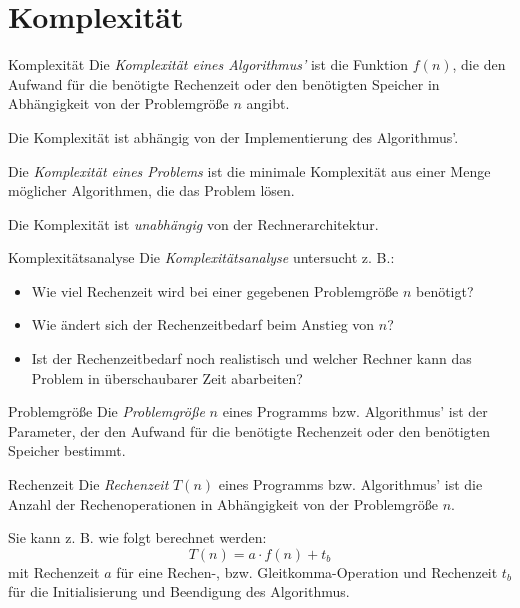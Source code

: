 \section{Komplexität}\label{sec:komplexitaet}

\begin{defi}{Komplexität}
    Die \emph{Komplexität eines Algorithmus'} ist die Funktion $f(n)$, die den Aufwand für die benötigte Rechenzeit oder den benötigten Speicher in Abhängigkeit von der Problemgröße $n$ angibt.

    Die Komplexität ist abhängig von der Implementierung des Algorithmus'.

    Die \emph{Komplexität eines Problems} ist die minimale Komplexität aus einer Menge möglicher Algorithmen, die das Problem lösen.

    Die Komplexität ist \emph{unabhängig} von der Rechnerarchitektur.
\end{defi}

\begin{bonus}{Komplexitätsanalyse}
    Die \emph{Komplexitätsanalyse} untersucht z. B.:
    \begin{itemize}
        \item Wie viel Rechenzeit wird bei einer gegebenen Problemgröße $n$ benötigt?
        \item Wie ändert sich der Rechenzeitbedarf beim Anstieg von $n$?
        \item Ist der Rechenzeitbedarf noch realistisch und welcher Rechner kann das Problem in überschaubarer Zeit abarbeiten?
    \end{itemize}
\end{bonus}

\begin{defi}[Komplexität]{Problemgröße}
    Die \emph{Problemgröße} $n$ eines Programms bzw. Algorithmus' ist der Parameter, der den Aufwand für die benötigte Rechenzeit oder den benötigten Speicher bestimmt.
\end{defi}

\begin{defi}[Komplexität]{Rechenzeit}
    Die \emph{Rechenzeit} $T(n)$ eines Programms bzw. Algorithmus' ist die Anzahl der Rechenoperationen in Abhängigkeit von der Problemgröße $n$.

    Sie kann z. B. wie folgt berechnet werden:
    \[T(n) = a\cdot f(n) + t_b\]
    mit Rechenzeit $a$ für eine Rechen-, bzw. Gleitkomma-Operation und Rechenzeit $t_b$ für die Initialisierung und Beendigung des Algorithmus.
\end{defi}

